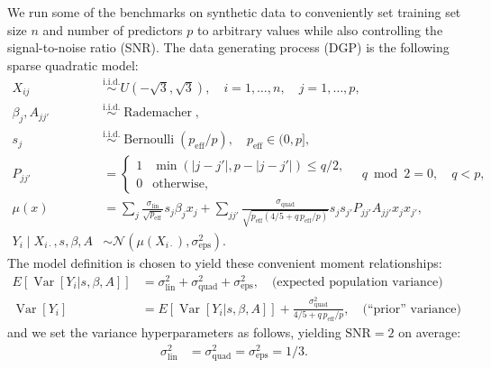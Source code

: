 \documentclass{article}
\begin{document}
We run some of the benchmarks on synthetic data to conveniently set training
set size $n$ and number of predictors $p$ to arbitrary values while also
controlling the signal-to-noise ratio (SNR). The data generating process (DGP) is the
following sparse quadratic model:
%
\begin{align}
	X_{ij}                               & \overset{\mathrm{i.i.d.}}\sim U(-\sqrt 3, \sqrt 3), \quad i = 1, \ldots, n, \quad j = 1, \ldots, p,               \\
	\beta_j, A_{jj'}                     & \overset{\mathrm{i.i.d.}}\sim \operatorname{Rademacher}, \\
	s_j & \overset{\mathrm{i.i.d.}}\sim \operatorname{Bernoulli}(p_\text{eff}/p), \quad p_\text{eff}\in(0, p], \\
	P_{jj'}                              & = \begin{cases}
		                                         1 & \min(|j-j'|,p-|j-j'|) \le q/2, \\
		                                         0 & \text{otherwise,}
	                                         \end{cases} \quad q \bmod 2 = 0, \quad q < p,                                                                  \\
	\mu(x) &= \sum_j
	\frac{\sigma_\text{lin}}{\sqrt{p_\text{eff}}}
	s_j \beta_j x_j + \sum_{jj'}
	\frac{\sigma_\text{quad}}{\sqrt{p_\text{eff}(4/5 + q\,p_\text{eff}/p )}}
	s_j s_{j'} P_{jj'} A_{jj'} x_j x_{j'}, \\
	Y_i\mid X_{i\cdot},s,\beta,A           & \sim \mathcal N\left(\mu(X_{i\cdot}), \sigma^2_\text{eps}\right). \label{eq:dgp}
\end{align}
%
The model definition is chosen to yield these convenient moment relationships:
%
\begin{align}
	E[\operatorname{Var}[Y_i|s,\beta,A]] & = \sigma^2_\text{lin} + \sigma^2_\text{quad} + \sigma^2_\text{eps}, \quad \text{(expected population variance)} \label{eq:popvar}  \\
	\operatorname{Var}[Y_i] & = E[\operatorname{Var}[Y_i|s,\beta,A]] + \frac{\sigma^2_\text{quad}} {4/5 + q\,p_\text{eff}/p }, \quad \text{(``prior'' variance)} \label{eq:priorvar}
\end{align}
%
and we set the variance hyperparameters as follows, yielding $\text{SNR}=2$ on average:
%
\begin{align}
	\sigma^2_\text{lin} &= \sigma^2_\text{quad} = \sigma^2_\text{eps} = 1/3.
\end{align}
\end{document}
